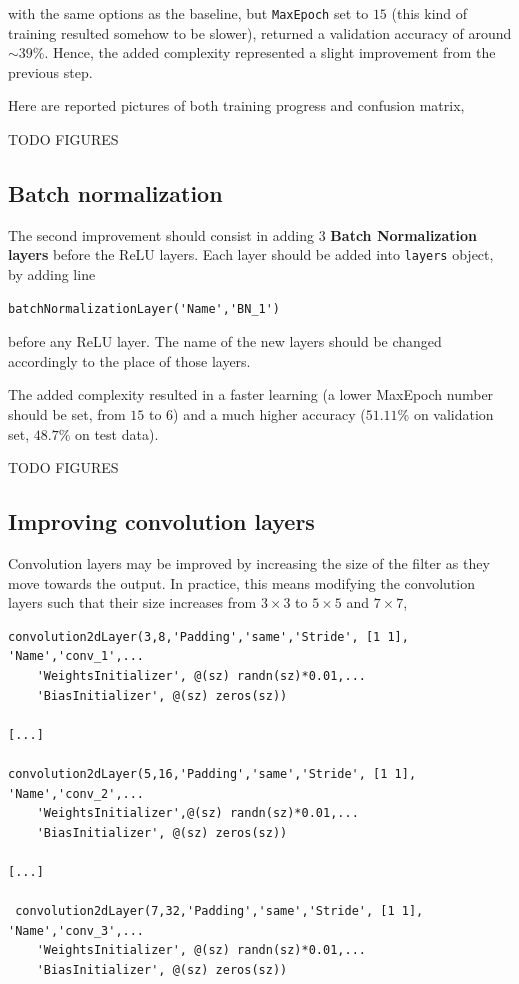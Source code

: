 \documentclass[a4paper, 11pt]{article} %
\begin{document}
with the same options as the baseline, but \texttt{MaxEpoch} set to $15$ (this kind of training resulted somehow to be slower), returned a validation accuracy of around $\sim 39\%$. Hence, the added complexity represented a slight improvement from the previous step.

Here are reported pictures of both training progress and confusion matrix,

TODO FIGURES

\subsection{Batch normalization}

The second improvement should consist in adding $3$ \textbf{Batch Normalization layers} before the ReLU layers. Each layer should be added into \texttt{layers} object, by adding line

\begin{lstlisting}
batchNormalizationLayer('Name','BN_1')
\end{lstlisting} 

before any ReLU layer. The name of the new layers should be changed accordingly to the place of those layers.

The added complexity resulted in a faster learning (a lower MaxEpoch number should be set, from $15$ to $6$) and a much higher accuracy ($51.11\%$ on validation set, $48.7\%$ on test data).

TODO FIGURES

\subsection{Improving convolution layers}

Convolution layers may be improved by increasing the size of the filter as they move towards the output. In practice, this means modifying the convolution layers such that their size increases from $3\times 3$ to $5\times 5$ and $7 \times 7$,

\begin{lstlisting}
convolution2dLayer(3,8,'Padding','same','Stride', [1 1], 'Name','conv_1',...
    'WeightsInitializer', @(sz) randn(sz)*0.01,...
    'BiasInitializer', @(sz) zeros(sz))

[...]

convolution2dLayer(5,16,'Padding','same','Stride', [1 1], 'Name','conv_2',...
    'WeightsInitializer',@(sz) randn(sz)*0.01,...
    'BiasInitializer', @(sz) zeros(sz))

[...]

 convolution2dLayer(7,32,'Padding','same','Stride', [1 1], 'Name','conv_3',...
    'WeightsInitializer', @(sz) randn(sz)*0.01,...
    'BiasInitializer', @(sz) zeros(sz))
\end{lstlisting}
\end{document}
